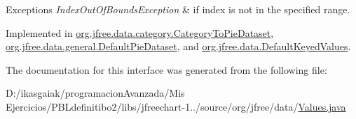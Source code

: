 \begin{DoxyExceptions}{Exceptions}
{\em Index\+Out\+Of\+Bounds\+Exception} & if {\ttfamily index} is not in the specified range. \\
\hline
\end{DoxyExceptions}


Implemented in \mbox{\hyperlink{classorg_1_1jfree_1_1data_1_1category_1_1_category_to_pie_dataset_a994ec52d8053b1ac0604dae5495fff5f}{org.\+jfree.\+data.\+category.\+Category\+To\+Pie\+Dataset}}, \mbox{\hyperlink{classorg_1_1jfree_1_1data_1_1general_1_1_default_pie_dataset_af7ed54fb104914f6bc70c5fea2470fdb}{org.\+jfree.\+data.\+general.\+Default\+Pie\+Dataset}}, and \mbox{\hyperlink{classorg_1_1jfree_1_1data_1_1_default_keyed_values_a38fcea7e618e557e028940a48ffc61f0}{org.\+jfree.\+data.\+Default\+Keyed\+Values}}.



The documentation for this interface was generated from the following file\+:\begin{DoxyCompactItemize}
\item 
D\+:/ikasgaiak/programacion\+Avanzada/\+Mis Ejercicios/\+P\+B\+Ldefinitibo2/libs/jfreechart-\/1../source/org/jfree/data/\mbox{\hyperlink{_values_8java}{Values.\+java}}\end{DoxyCompactItemize}
